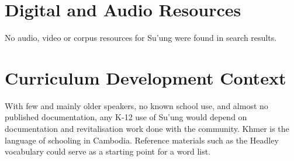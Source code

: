 \documentclass[12pt]{article}
\begin{document}
\section{Digital and Audio Resources}
No audio, video or corpus resources for Su'ung were found in search results.

\section{Curriculum Development Context}
With few and mainly older speakers, no known school use, and almost no published documentation, any K-12 use of Su'ung would depend on documentation and revitalisation work done with the community. Khmer is the language of schooling in Cambodia. Reference materials such as the Headley vocabulary could serve as a starting point for a word list.
\end{document}
